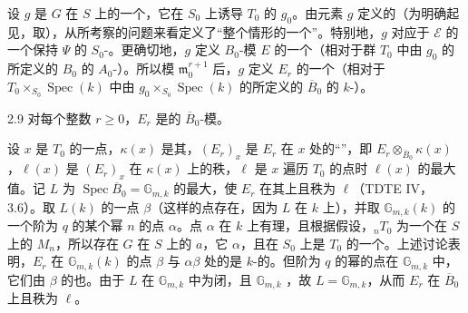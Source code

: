 设 $g$ 是 $G$ 在 $S$ 上的一个，它在 $S_0$ 上诱导 $T_0$ 的 $g_0$。由元素 $g$ 定义的（为明确起见，取），从所考察的问题来看定义了“整个情形的一个”。特别地，$g$ 对应于 $\mathcal E$ 的一个保持 $\Psi$ 的 $S_0$-。更确切地，$g$ 定义 $B_0$-模 $E$ 的一个（相对于群 $T_0$ 中由 $g_0$ 的所定义的 $B_0$ 的 $A_0$-）。所以模 $\mathfrak m_0^{r+1}$ 后，$g$ 定义 $E_r$ 的一个（相对于 $T_0\times_{S_0}\operatorname{Spec}(k)$ 中由 $g_0\times_{S_0}\operatorname{Spec}(k)$ 的所定义的 $\overline B_0$ 的 $k$-）。
\begin{SGAresult}{}{2.9}
对每个整数 $r\ge0$，$E_r$ 是的 $\overline B_0$-模。
\end{SGAresult}
设 $x$ 是 $T_0$ 的一点，$\kappa(x)$ 是其，$(E_r)_x$ 是 $E_r$ 在 $x$ 处的“”，即 $E_r\otimes_{\overline B_0}\kappa(x)$，$\ell(x)$ 是 $(E_r)_x$ 在 $\kappa(x)$ 上的秩，$\ell$ 是 $x$ 遍历 $T_0$ 的点时 $\ell(x)$ 的最大值。记 $L$ 为 $\operatorname{Spec}\overline B_0=\mathbb G_{m,k}$ 的最大，使 $E_r$ 在其上且秩为 $\ell$（TDTE IV， 3.6）。取 $L(k)$ 的一点 $\beta$（这样的点存在，因为 $L$ 在 $k$ 上），并取 $\mathbb G_{m,k}(k)$ 的一个阶为 $q$ 的某个幂 $n$ 的点 $\alpha$。点 $\alpha$ 在 $k$ 上有理，且根据假设，${}_nT_0$ 为一个在 $S$ 上的 $M_n$，所以存在 $G$ 在 $S$ 上的 $a$，它 $\alpha$，且在 $S_0$ 上是 $T_0$ 的一个。上述讨论表明，$E_r$ 在 $\mathbb G_{m,k}(k)$ 的点 $\beta$ 与 $\alpha\beta$ 处的是 $k$-的。但阶为 $q$ 的幂的点在 $\mathbb G_{m,k}$ 中，它们由 $\beta$ 的也。由于 $L$ 在 $\mathbb G_{m,k}$ 中为闭，且 $\mathbb G_{m,k}$ ，故 $L=\mathbb G_{m,k}$，从而 $E_r$ 在 $\overline B_0$ 上且秩为 $\ell$。

